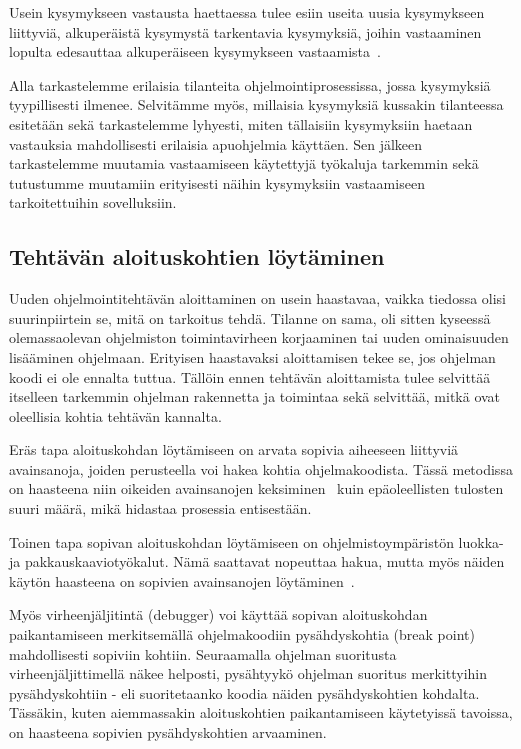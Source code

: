 \documentclass[finnish]{../tktltiki2}
\theoremstyle{definition}
\theoremstyle{remark}
\begin{document}
Usein kysymykseen vastausta haettaessa tulee esiin useita uusia kysymykseen liittyviä, alkuperäistä kysymystä tarkentavia kysymyksiä, joihin vastaaminen lopulta edesauttaa alkuperäiseen kysymykseen vastaamista~\cite{questions-during-software-evolution-tasks}.

Alla tarkastelemme erilaisia tilanteita ohjelmointiprosessissa, jossa kysymyksiä tyypillisesti ilmenee. Selvitämme myös, millaisia kysymyksiä kussakin tilanteessa esitetään sekä tarkastelemme lyhyesti, miten tällaisiin kysymyksiin haetaan vastauksia mahdollisesti erilaisia apuohjelmia käyttäen. Sen jälkeen tarkastelemme muutamia vastaamiseen käytettyjä työkaluja tarkemmin sekä tutustumme muutamiin erityisesti näihin kysymyksiin vastaamiseen tarkoitettuihin sovelluksiin.

\subsection{Tehtävän aloituskohtien löytäminen}
Uuden ohjelmointitehtävän aloittaminen on usein haastavaa, vaikka tiedossa olisi suurinpiirtein se, mitä on tarkoitus tehdä. Tilanne on sama, oli sitten kyseessä olemassaolevan ohjelmiston toimintavirheen korjaaminen tai uuden ominaisuuden lisääminen ohjelmaan. Erityisen haastavaksi aloittamisen tekee se, jos ohjelman koodi ei ole ennalta tuttua. Tällöin ennen tehtävän aloittamista tulee selvittää itselleen tarkemmin ohjelman rakennetta ja toimintaa sekä selvittää, mitkä ovat oleellisia kohtia tehtävän kannalta.

Eräs tapa aloituskohdan löytämiseen on arvata sopivia aiheeseen liittyviä avainsanoja, joiden perusteella voi hakea kohtia ohjelmakoodista. Tässä metodissa on haasteena niin oikeiden avainsanojen keksiminen~\cite{what-to-search-for} kuin epäoleellisten tulosten suuri määrä, mikä hidastaa prosessia entisestään.

Toinen tapa sopivan aloituskohdan löytämiseen on ohjelmistoympäristön luokka- ja pakkauskaaviotyökalut. Nämä saattavat nopeuttaa hakua, mutta myös näiden käytön haasteena on sopivien avainsanojen löytäminen~\cite{what-to-search-for}.

Myös virheenjäljitintä (debugger) voi käyttää sopivan aloituskohdan paikantamiseen merkitsemällä ohjelmakoodiin pysähdyskohtia (break point) mahdollisesti sopiviin kohtiin. Seuraamalla ohjelman suoritusta virheenjäljittimellä näkee helposti, pysähtyykö ohjelman suoritus merkittyihin pysähdyskohtiin - eli suoritetaanko koodia näiden pysähdyskohtien kohdalta. Tässäkin, kuten aiemmassakin aloituskohtien paikantamiseen käytetyissä tavoissa, on haasteena sopivien pysähdyskohtien arvaaminen.
\end{document}
